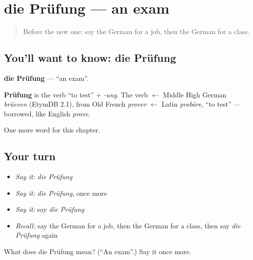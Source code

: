 \section[die Prüfung]{die Prüfung — an exam}

\label{lesson:GE-C127-pruefung}



\begin{quote}
Before the new one: say the German for a job, then the German for a class.
\end{quote}

\subsection*{You'll want to know: die Prüfung}
\textbf{die Prüfung} — \textquotedblleft{}an exam\textquotedblright{}.

\begin{cousinweb}
\textbf{Prüfung} is the verb \textquotedblleft{}to test\textquotedblright{} + \emph{-ung}. The verb $\leftarrow$ Middle High German \emph{brüeven} (EtymDB 2.1), from Old French \emph{prover} $\leftarrow$ Latin \emph{probāre}, \textquotedblleft{}to test\textquotedblright{} — borrowed, like English \emph{prove}.
\end{cousinweb}

\begin{grammarlens}[title={What you've built}]
One more word for this chapter.
\end{grammarlens}

\subsection*{Your turn}
\begin{itemize}
\raggedright
  \item \emph{Say it:} \emph{die Prüfung}
  \item \emph{Say it:} \emph{die Prüfung}, once more
  \item \emph{Say it:} say \emph{die Prüfung}
  \item \emph{Recall:} say the German for a job, then the German for a class, then say \emph{die Prüfung} again
\end{itemize}

\begin{tcolorbox}[breakable,colback=teal!4,colframe=teal!35!black,title={Before you move on}]
What does die Prüfung mean? (\textquotedblleft{}An exam\textquotedblright{}.) Say it once more.
\end{tcolorbox}

